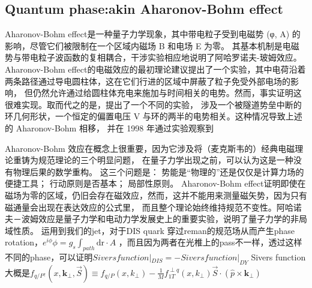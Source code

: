 \documentclass[12pt, a4paper, oneside]{ctexart}
\begin{document}
\begin{spacing}{2.0}
\subsection{Quantum phase:akin Aharonov-Bohm effect}
Aharonov-Bohm effect是一种量子力学现象，其中带电粒子受到电磁势 (φ, A) 的影响，尽管它们被限制在一个区域内磁场 B 和电场 E 为零。
其基本机制是电磁势与带电粒子波函数的复相耦合，干涉实验相应地说明了阿哈罗诺夫-玻姆效应。
Aharonov-Bohm effect的电磁效应的最初理论建议提出了一个实验，其中电荷沿着两条路径通过导电圆柱体，这在它们行进的区域中屏蔽了粒子免受外部电场的影响，
但仍然允许通过给圆柱体充电来施加与时间相关的电势。然而，事实证明这很难实现。取而代之的是，提出了一个不同的实验，
涉及一个被隧道势垒中断的环几何形状，一个恒定的偏置电压 V 与环的两半的电势相关。这种情况导致上述的 Aharonov-Bohm 相移，
并在 1998 年通过实验观察到

Aharonov-Bohm 效应在概念上很重要，因为它涉及将（麦克斯韦的）经典电磁理论重铸为规范理论的三个明显问题，
在量子力学出现之前，可以认为这是一种没有物理后果的数学重构。
这三个问题是：
势能是“物理的”还是仅仅是计算力场的便捷工具；
行动原则是否基本；
局部性原则。
Aharonov-Bohm effect证明即使在磁场为零的区域，仍旧会存在磁效应，然而，这并不能用来测量磁矢势，因为只有磁通量会出现在表达效应的公式里，
而且整个理论始终维持规范不变性。阿哈诺夫－波姆效应是量子力学和电动力学发展史上的重要实验，说明了量子力学的非局域性质。
运用到我们的jet，对于DIS quark 穿过reman的规范场从而产生phase rotation，$e^{i\phi}$$\phi = g_s \int_{path} \mathrm{d r}\cdot A$
，而且因为两者在光椎上的pass不一样，透过这样不同的phase，可以证明$Sivers function|_{DIS} = -Sivers function|_{DY}$
Sivers function大概是$f_{q / P^{\uparrow}}\left(x, \mathbf{k}_{\perp}, \vec{S}\right) \equiv f_{q / P}\left(x, k_{\perp}\right)-\frac{1}{M} f_{1 T}^{\perp q}\left(x, k_{\perp}\right) \vec{S} \cdot\left(\hat{p} \times \mathbf{k}_{\perp}\right)$


\end{spacing}
\end{document}

